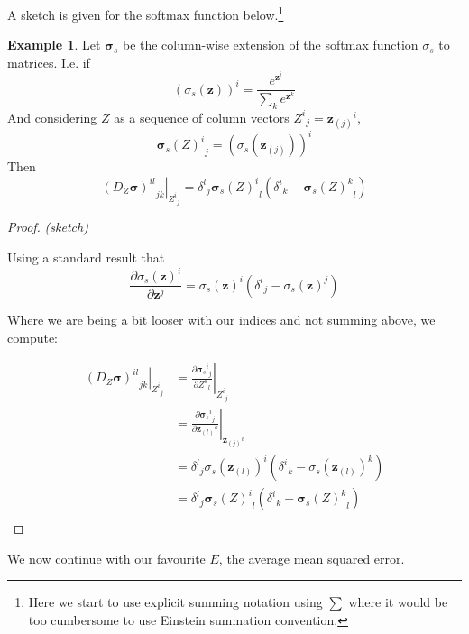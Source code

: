 \documentclass[a4paper]{article}
\theoremstyle{plain} %
\theoremstyle{definition} %
\newtheorem*{example}{Example}
\numberwithin{equation}{subsection}
\newcommand{\del}[2]{\frac{\partial #1}{\partial #2}}
\newcommand{\vz}{{\textbf{z}}}
\newcommand{\vsigma}{{\bm{\sigma}}} %
\begin{document}
A sketch is given for the softmax function below.\footnote{Here we start to use explicit summing notation using $\sum$ where it would be too cumbersome to use Einstein summation convention.}
\begin{example}
  Let $\vsigma_s$ be the column-wise extension of the softmax function $\sigma_s$ to matrices. I.e. if 
  \[ (\sigma_s(\vz))^i =  \frac{e^{\vz^i}}{\sum_k e^{\vz^k}}\]
  And considering $Z$ as a sequence of column vectors ${Z^i}_j = {\vz_{(j)}}^i$,
  \[ {\vsigma_s (Z)^i}_j = (\sigma_s (\vz_{(j)}))^i\]
  Then 
  \[ \left. {(D_Z \vsigma)^{il}}_{jk}\right\vert_{{Z^i}_j} = {\delta^l}_j {\vsigma_s(Z)^i}_l({\delta^i}_k - {\vsigma_s(Z)^k}_l) \]
\end{example}
\begin{proof} \emph{(sketch)}
  
  Using a standard result that
  \[ \del{\sigma_s(\vz)^i}{\vz^j} = \sigma_s(\vz)^i({\delta^i}_j - \sigma_s(\vz)^j)\]

  Where we are being a bit looser with our indices and not summing above, we compute:

  \begin{align*}
    \left. {(D_Z \vsigma)^{il}}_{jk}\right\vert_{{Z^i}_j} &= \left. \del{{{\vsigma_s}^i}_j}{{Z^k}_l}\right\vert_{{Z^i}_j} \\
     &= \left. \del{{{\vsigma_s}^i}_j}{{\vz_{(l)}}^k}\right\vert_{{\vz_{(j)}}^i} \\
     &= {\delta^l}_j \sigma_s(\vz_{(l)})^i({\delta^i}_k - \sigma_s(\vz_{(l)})^k) \\
     &= {\delta^l}_j {\vsigma_s(Z)^i}_l({\delta^i}_k - {\vsigma_s(Z)^k}_l) \\
  \end{align*}
\end{proof}
We now continue with our favourite $E$, the average mean squared error.
\end{document}
